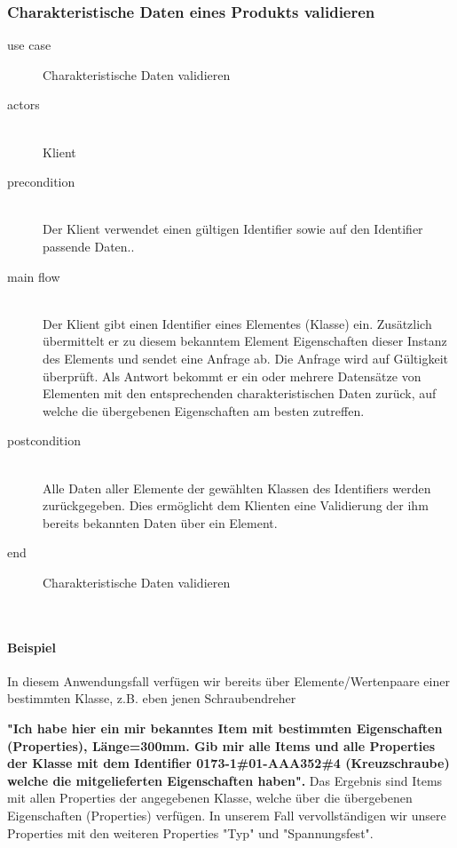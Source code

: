 \subsubsection{Charakteristische Daten eines Produkts validieren}

{\small

\begin{description}
     \item[use case] Charakteristische Daten validieren
     \item[  actors]~\\
     Klient
     \item[  precondition]~\\
     Der Klient verwendet einen gültigen Identifier sowie auf den Identifier passende Daten..
     \item[  main flow]~\\
     Der Klient gibt einen Identifier eines Elementes (Klasse) ein. Zusätzlich übermittelt er zu diesem bekanntem Element Eigenschaften dieser Instanz des Elements und sendet eine Anfrage ab. Die Anfrage wird auf Gültigkeit überprüft. Als Antwort bekommt er ein oder mehrere Datensätze von Elementen mit den entsprechenden charakteristischen Daten zurück, auf welche die übergebenen Eigenschaften am besten zutreffen. 
     \item[  postcondition]~\\
     Alle Daten aller Elemente der gewählten Klassen des Identifiers werden zurückgegeben. Dies ermöglicht dem Klienten eine Validierung der ihm bereits bekannten Daten über ein Element. 
     \item[end] Charakteristische Daten validieren
\end{description}

~\\

} %

\paragraph{Beispiel}

In diesem Anwendungsfall verfügen wir bereits über Elemente/Wertenpaare einer bestimmten Klasse, z.B. eben jenen Schraubendreher

\textbf{"Ich habe hier ein mir bekanntes Item mit bestimmten Eigenschaften (Properties), Länge=300mm. Gib mir alle Items und alle Properties der Klasse mit dem Identifier 0173-1\#01-AAA352\#4 (Kreuzschraube) welche die mitgelieferten Eigenschaften haben".}
Das Ergebnis sind Items mit allen Properties der angegebenen Klasse, welche über die übergebenen Eigenschaften (Properties) verfügen. In unserem Fall vervollständigen wir unsere Properties mit den weiteren Properties "Typ" und "Spannungsfest".


